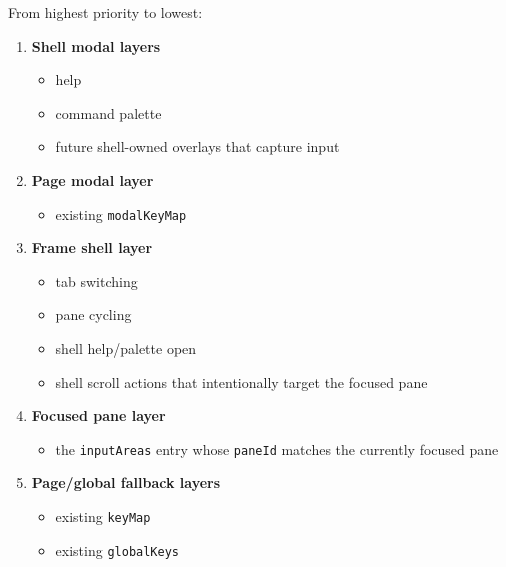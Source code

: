 From highest priority to lowest:

\begin{enumerate}
\def\labelenumi{\arabic{enumi}.}
\tightlist
\item
  \textbf{Shell modal layers}

  \begin{itemize}
  \tightlist
  \item
    help
  \item
    command palette
  \item
    future shell-owned overlays that capture input
  \end{itemize}
\item
  \textbf{Page modal layer}

  \begin{itemize}
  \tightlist
  \item
    existing \texttt{m\allowbreak{}o\allowbreak{}d\allowbreak{}a\allowbreak{}l\allowbreak{}K\allowbreak{}e\allowbreak{}y\allowbreak{}M\allowbreak{}a\allowbreak{}p}
  \end{itemize}
\item
  \textbf{Frame shell layer}

  \begin{itemize}
  \tightlist
  \item
    tab switching
  \item
    pane cycling
  \item
    shell help/palette open
  \item
    shell scroll actions that intentionally target the focused pane
  \end{itemize}
\item
  \textbf{Focused pane layer}

  \begin{itemize}
  \tightlist
  \item
    the \texttt{i\allowbreak{}n\allowbreak{}p\allowbreak{}u\allowbreak{}t\allowbreak{}A\allowbreak{}r\allowbreak{}e\allowbreak{}a\allowbreak{}s} entry whose \texttt{p\allowbreak{}a\allowbreak{}n\allowbreak{}e\allowbreak{}I\allowbreak{}d} matches the currently focused pane
  \end{itemize}
\item
  \textbf{Page/global fallback layers}

  \begin{itemize}
  \tightlist
  \item
    existing \texttt{k\allowbreak{}e\allowbreak{}y\allowbreak{}M\allowbreak{}a\allowbreak{}p}
  \item
    existing \texttt{g\allowbreak{}l\allowbreak{}o\allowbreak{}b\allowbreak{}a\allowbreak{}l\allowbreak{}K\allowbreak{}e\allowbreak{}y\allowbreak{}s}
  \end{itemize}
\end{enumerate}

